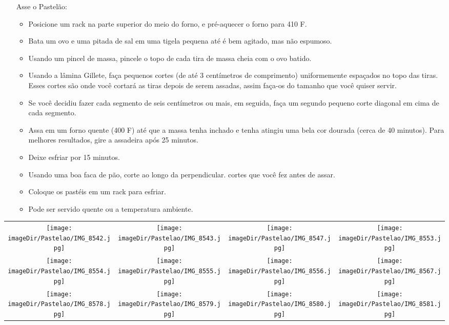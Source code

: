 \documentclass [11pt, letterpaper] {article}
\begin{document}
\begin {description}
\begin{enumerate}
\item [Asse o Pastel\~ao:] \ \\
        \begin {itemize}
        \item Posicione um rack na parte superior do meio do forno,
        e pré-aquecer o forno para 410 F.
        \item Bata um ovo e uma pitada de sal em uma tigela pequena até
        é bem agitado, mas não espumoso.
        \item Usando um pincel de massa, pincele o topo de cada
        tira de massa cheia com o ovo batido.
        \item Usando a l\^amina Gillete, faça pequenos 
        cortes (de até 3 cent\'imetros de comprimento) uniformemente espaçados no topo das tiras. Esses cortes são
        onde você cortará as tiras depois de serem assadas, assim
        faça-os do tamanho que voc\^e quiser servir.
        \item Se você decidiu fazer cada segmento de seis cent\'imetros ou mais,
        em seguida, faça um segundo pequeno corte diagonal em cima de cada segmento.
        \item Assa em um forno quente (400 F) até que a massa tenha inchado e tenha
        atingiu uma bela cor dourada (cerca de 40 minutos). Para melhores resultados, gire a assadeira após 25 minutos.
        \item Deixe esfriar por 15 minutos.
        \item Usando uma boa faca de pão, corte ao longo da perpendicular.
        cortes que você fez antes de assar.
        \item Coloque os pastéis em um rack para esfriar.
        \item Pode ser servido quente ou a temperatura ambiente.
        \end {itemize}
\end {enumerate}
\end {description}

\begin{table}
\begin{tabular}{cccc}
\texttt{[image: \\imageDir/Pastelao/IMG\_8542.jpg]} &
\texttt{[image: \\imageDir/Pastelao/IMG\_8543.jpg]} &
\texttt{[image: \\imageDir/Pastelao/IMG\_8547.jpg]} &
\texttt{[image: \\imageDir/Pastelao/IMG\_8553.jpg]} \\
\texttt{[image: \\imageDir/Pastelao/IMG\_8554.jpg]} &
\texttt{[image: \\imageDir/Pastelao/IMG\_8555.jpg]} &
\texttt{[image: \\imageDir/Pastelao/IMG\_8556.jpg]} &
\texttt{[image: \\imageDir/Pastelao/IMG\_8567.jpg]} \\
\texttt{[image: \\imageDir/Pastelao/IMG\_8578.jpg]} &
\texttt{[image: \\imageDir/Pastelao/IMG\_8579.jpg]} &
\texttt{[image: \\imageDir/Pastelao/IMG\_8580.jpg]} &
\texttt{[image: \\imageDir/Pastelao/IMG\_8581.jpg]} \\
\end{tabular}
\end{table}
\end{document}
